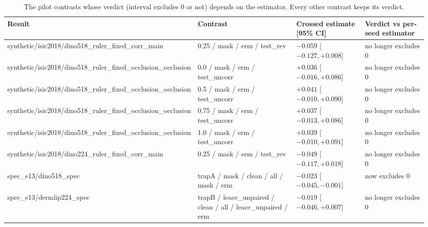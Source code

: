 \begin{table}[H]\centering\scriptsize
\caption{The pilot contrasts whose verdict (interval excludes 0 or not) depends on the estimator. Every other contrast keeps its verdict.}\label{tab:estchanges}
\begin{tabular}{p{4.2cm}p{5.2cm}p{3.3cm}p{2.6cm}}\toprule
Result & Contrast & Crossed estimate [95\% CI] & Verdict vs per-seed estimator \\\midrule
synthetic/\allowbreak{}isic2018/\allowbreak{}dino518\_ruler\_fixed\_corr\_main & 0.25 /\allowbreak{} mask /\allowbreak{} erm /\allowbreak{} test\_rev & $-0.059$ [$-0.127, +0.008$] & no longer excludes 0 \\
synthetic/\allowbreak{}isic2018/\allowbreak{}dino518\_ruler\_fixed\_occlusion\_occlusion & 0.0 /\allowbreak{} mask /\allowbreak{} erm /\allowbreak{} test\_uncorr & $+0.036$ [$-0.016, +0.086$] & no longer excludes 0 \\
synthetic/\allowbreak{}isic2018/\allowbreak{}dino518\_ruler\_fixed\_occlusion\_occlusion & 0.5 /\allowbreak{} mask /\allowbreak{} erm /\allowbreak{} test\_uncorr & $+0.041$ [$-0.010, +0.090$] & no longer excludes 0 \\
synthetic/\allowbreak{}isic2018/\allowbreak{}dino518\_ruler\_fixed\_occlusion\_occlusion & 0.75 /\allowbreak{} mask /\allowbreak{} erm /\allowbreak{} test\_uncorr & $+0.037$ [$-0.013, +0.086$] & no longer excludes 0 \\
synthetic/\allowbreak{}isic2018/\allowbreak{}dino518\_ruler\_fixed\_occlusion\_occlusion & 1.0 /\allowbreak{} mask /\allowbreak{} erm /\allowbreak{} test\_uncorr & $+0.039$ [$-0.010, +0.091$] & no longer excludes 0 \\
synthetic/\allowbreak{}isic2018/\allowbreak{}dino224\_ruler\_fixed\_corr\_main & 0.25 /\allowbreak{} mask /\allowbreak{} erm /\allowbreak{} test\_rev & $-0.049$ [$-0.117, +0.018$] & no longer excludes 0 \\
spec\_e13/\allowbreak{}dino518\_spec & trapA /\allowbreak{} mask /\allowbreak{} clean /\allowbreak{} all /\allowbreak{} mask /\allowbreak{} erm & $-0.023$ [$-0.045, -0.001$] & now excludes 0 \\
spec\_e13/\allowbreak{}dermlip224\_spec & trapB /\allowbreak{} leace\_unpaired /\allowbreak{} clean /\allowbreak{} all /\allowbreak{} leace\_unpaired /\allowbreak{} erm & $-0.019$ [$-0.046, +0.007$] & no longer excludes 0 \\
\bottomrule\end{tabular}
\end{table}
